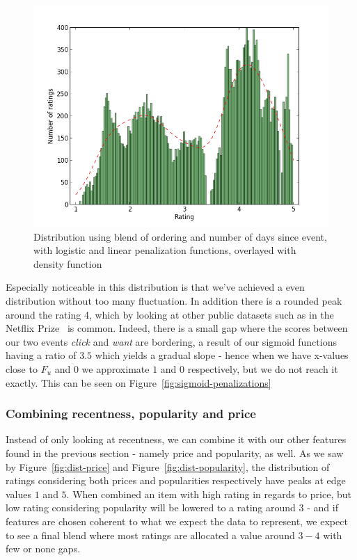 \begin{figure}[H]
  \centering
  \includegraphics[scale=0.5]{image/dist-blend}
  \caption[Distribution using blend of ordering and number of days since event]{Distribution using blend of ordering and number of days since event,
  with logistic and linear penalization functions, overlayed with density
  function}
  \label{dist-blend}
\end{figure}

Especially noticeable in this distribution is that we've achieved a even
distribution without too many fluctuation. In addition there is a rounded peak
around the rating 4, which by looking at other public datasets such as in the
Netflix Prize~\cite{Netflix} is common. Indeed, there is a small gap where the
scores between our two events \textit{click} and \textit{want} are bordering, a
result of our sigmoid functions having a ratio of $3.5$ which yields a gradual
slope - hence when we have x-values close to $F_u$ and $0$ we approximate $1$
and $0$ respectively, but we do not reach it exactly. This can be seen on
Figure~\ref{fig:sigmoid-penalizations}

\subsubsection{Combining recentness, popularity and price}

Instead of only looking at recentness, we can combine it with our other
features found in the previous section - namely price and popularity, as well.
As we saw by Figure~\ref{fig:dist-price} and Figure~\ref{fig:dist-popularity}, the
distribution of ratings considering both prices and popularities respectively
have peaks at edge values $1$ and $5$. When combined an item with high rating
in regards to price, but low rating considering popularity will be lowered to a
rating around $3$ - and if features are chosen coherent to what we expect the
data to represent, we expect to see a final blend where most ratings are
allocated a value around $3-4$ with few or none gaps.

